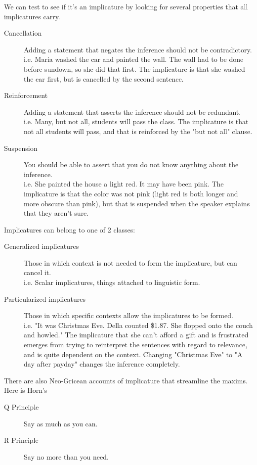 \documentclass[11pt]{article}
\begin{document}
We can test to see if it's an implicature by looking for several properties that all implicatures carry.
\begin{description}
    \item[Cancellation] Adding a statement that negates the inference should not be contradictory. \\
        i.e. Maria washed the car and painted the wall. The wall had to be done before sundown, so she did
        that first. The implicature is that she washed the car first, but is cancelled by the second 
        sentence.
    \item[Reinforcement] Adding a statement that asserts the inference should not be redundant. \\
        i.e. Many, but not all, students will pass the class. The implicature is that not all students
        will pass, and that is reinforced by the "but not all" clause.
    \item[Suspension] You should be able to assert that you do not know anything about the inference. \\
        i.e. She painted the house a light red. It may have been pink. The implicature is that the 
        color was not pink (light red is both longer and more obscure than pink), but that is 
        suspended when the speaker explains that they aren't sure.
\end{description}

Implicatures can belong to one of 2 classes:
\begin{description}
    \item[Generalized implicatures] Those in which context is not needed to form the implicature, but can 
        cancel it. \\
        i.e. Scalar implicatures, things attached to linguistic form.
    \item[Particularized implicatures] Those in which specific contexts allow the implicatures to be formed. \\
        i.e. "It was Christmas Eve. Della counted \$1.87. She flopped onto the couch and howled." The 
        implicature that she can't afford a gift and is frustrated emerges from trying to reinterpret the 
        sentences with regard to relevance, and is quite dependent on the context. Changing "Christmas Eve"
        to "A day after payday" changes the inference completely.
\end{description}

There are also Neo-Gricean accounts of implicature that streamline the maxims. Here is Horn's
\begin{description}
    \item[Q Principle] Say as much as you can.
    \item[R Principle] Say no more than you need.
\end{description}
\end{document}

